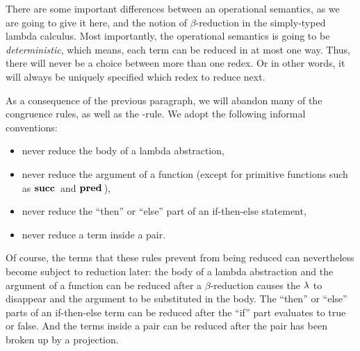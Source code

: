 \documentclass{article}
\begin{document}
There are some important differences between an operational semantics,
as we are going to give it here, and the notion of $\beta$-reduction
in the simply-typed lambda calculus. Most importantly, the operational
semantics is going to be {\em deterministic}, which means, each
term can be reduced in at most one way. Thus, there will never be a
choice between more than one redex. Or in other words, it will always
be uniquely specified which redex to reduce next.

As a consequence of the previous paragraph, we will abandon many of
the congruence rules, as well as the {\nrule{\xi}}-rule. We adopt the
following informal conventions:
\begin{itemize}
\item never reduce the body of a lambda abstraction,
\item never reduce the argument of a function (except for primitive
  functions such as $\mathop{\textbf{\bf succ}\,}$ and $\mathop{\textbf{\bf pred}\,}$),
\item never reduce the ``then'' or ``else'' part of an if-then-else
  statement,
\item never reduce a term inside a pair.
\end{itemize}

Of course, the terms that these rules prevent from being reduced can
nevertheless become subject to reduction later: the body of a lambda
abstraction and the argument of a function can be reduced after a
$\beta$-reduction causes the $\lambda$ to disappear and the argument
to be substituted in the body. The ``then'' or ``else'' parts of an
if-then-else term can be reduced after the ``if'' part evaluates to
true or false. And the terms inside a pair can be reduced after the
pair has been broken up by a projection.
\end{document}

